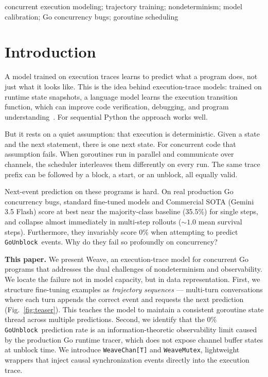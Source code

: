 \documentclass[10pt,conference]{IEEEtran}
\newcommand{\eunblock}{\texttt{GoUnblock}}
\begin{document}
\begin{IEEEkeywords}
concurrent execution modeling; trajectory training; nondeterminism;
model calibration; Go concurrency bugs; goroutine scheduling
\end{IEEEkeywords}

\section{Introduction}\label{sec:intro}

A model trained on execution traces learns to predict what a program
does, not just what it looks like.
This is the idea behind execution-trace models: trained on runtime
state snapshots, a language model learns the execution transition
function, which can improve code verification, debugging, and
program understanding~\cite{cwm,exectuning,codeexec}.
For sequential Python the approach works well.

But it rests on a quiet assumption: that execution is deterministic.
Given a state and the next statement, there is one next state.
For concurrent code that assumption fails.
When goroutines run in parallel and communicate over channels, the
scheduler interleaves them differently on every run.
The same trace prefix can be followed by a block, a start, or an
unblock, all equally valid.

Next-event prediction on these programs is hard. On real production Go concurrency
bugs, standard fine-tuned models and Commercial SOTA (Gemini 3.5 Flash) score
at best near the majority-class baseline (35.5\%) for single steps, and collapse almost immediately
in multi-step rollouts (${\sim}1.0$ mean survival steps). Furthermore, they invariably score
0\% when attempting to predict \eunblock\ events. Why do they fail so profoundly on concurrency?

\textbf{This paper.}
We present Weave, an execution-trace model for concurrent Go
programs that addresses the dual challenges of nondeterminism and observability.
We locate the failure not in model capacity, but in data representation.
First, we structure fine-tuning examples as \emph{trajectory sequences} —
multi-turn conversations where each turn appends the correct event and
requests the next prediction (Fig.~\ref{fig:teaser}).
This teaches the model to maintain a consistent goroutine state
thread across multiple predictions.
Second, we identify that the 0\% \eunblock\ prediction rate is an information-theoretic observability limit
caused by the production Go runtime tracer, which does not expose channel buffer states at unblock time.
We introduce \texttt{WeaveChan[T]} and \texttt{WeaveMutex}, lightweight wrappers that inject
causal synchronization events directly into the execution trace.
\end{document}
